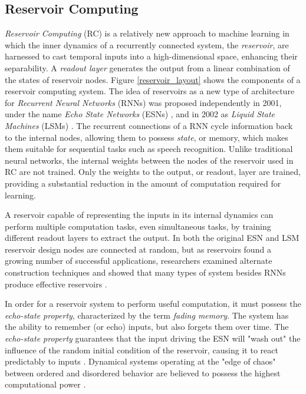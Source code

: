 \documentclass{elsarticle}
\begin{document}
\begin{multicols}{2}
\subsection{Reservoir Computing}
\textit{Reservoir Computing} (RC) is a relatively new approach to machine learning in 
which  the inner dynamics of a recurrently connected system, the 
\textit{reservoir}, are harnessed to cast temporal inputs into a 
high-dimensional space, enhancing their separability.  A \textit{readout layer} 
generates the output from a linear combination of the states of reservoir 
nodes. Figure \ref{reservoir_layout} shows the components of a reservoir 
computing system. The idea of reservoirs as a new type of architecture for 
\textit{Recurrent Neural Networks} (RNNs) was proposed independently in 2001, 
   under the name \textit{Echo State Networks} (ESNs) \cite{jaeger2001echo}, 
   and in 2002 as \textit{Liquid State Machines} (LSMs) \cite{maass2002real}.  
      The recurrent connections of a RNN cycle information back to the internal 
      nodes, allowing them to possess \textit{state}, or memory, which makes 
      them suitable for sequential tasks such as speech recognition. Unlike 
      traditional neural networks, the internal weights between the nodes of 
      the reservoir used in RC are not trained.  Only the weights to the 
      output, or readout, layer are trained, providing a substantial reduction 
      in the amount of computation required for learning. \par  A reservoir 
      capable of representing the inputs in its internal dynamics can perform 
      multiple computation tasks, even simultaneous tasks, by training 
      different readout layers to extract the output. In both the original ESN 
      and LSM reservoir design
nodes are connected at random, but as reservoirs found a growing number of 
successful applications, researchers examined alternate construction techniques 
\cite{lukovsevicius2007overview} and showed that many types of system besides 
RNNs produce effective reservoirs \cite{tanaka2018recent}.\par
    In order for a reservoir system to perform useful computation, it must 
    possess the \textit{echo-state property}, characterized by the term 
    \textit{fading memory}.  The system has the ability to remember (or echo) 
    inputs, but also forgets them over time. The \textit{echo-state property} 
    guarantees that the input driving the ESN will "wash out" the influence of 
    the random initial condition of the reservoir, causing it to react 
    predictably to inputs \cite{jaeger2001echo}. Dynamical systems operating at 
    the "edge of chaos" between ordered and disordered behavior are believed  
    to possess the highest computational power 
    \cite{langton1990computation}\cite{legenstein2007edge}.


\end{multicols}
\end{document}
